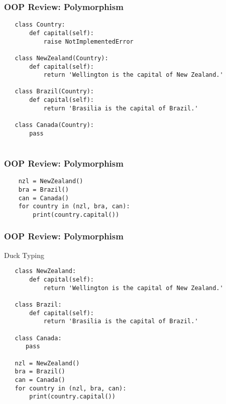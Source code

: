 \documentclass[10pt]{beamer}
\begin{document}
\begin{frame}[fragile]
  \frametitle{OOP Review: Polymorphism}
  
  \begin{verbatim}
   class Country:
       def capital(self):
           raise NotImplementedError
           
   class NewZealand(Country):
       def capital(self):
           return 'Wellington is the capital of New Zealand.'
      
   class Brazil(Country):
       def capital(self):
           return 'Brasilia is the capital of Brazil.'
           
   class Canada(Country):
       pass
       
   \end{verbatim}         
\end{frame}

\begin{frame}[fragile]
  \frametitle{OOP Review: Polymorphism}
  
  \begin{verbatim}
    nzl = NewZealand()
    bra = Brazil()
    can = Canada()
    for country in (nzl, bra, can):
        print(country.capital())
  \end{verbatim}         
\end{frame}

\begin{frame}[fragile]
  \frametitle{OOP Review: Polymorphism}
  
  Duck Typing
  
  \begin{verbatim}
   class NewZealand:
       def capital(self):
           return 'Wellington is the capital of New Zealand.'
     
   class Brazil:
       def capital(self):
           return 'Brasilia is the capital of Brazil.'
           
   class Canada:
      pass
      
   nzl = NewZealand()
   bra = Brazil()
   can = Canada()
   for country in (nzl, bra, can):
       print(country.capital())
  \end{verbatim}         
\end{frame}
\end{document}

